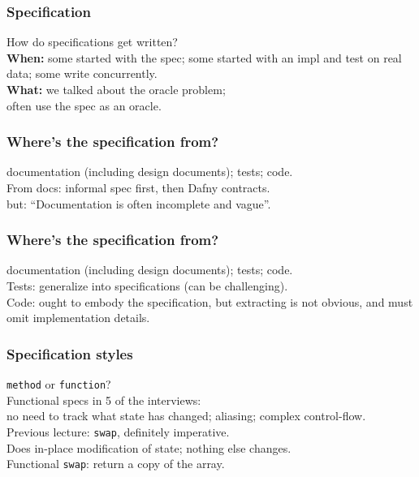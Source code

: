 \documentclass{beamer}
\newenvironment{changemargin}[1]{%
  \begin{list}{}{%
    \setlength{\topsep}{0pt}%
    \setlength{\leftmargin}{#1}%
    \setlength{\rightmargin}{1em}
    \setlength{\listparindent}{\parindent}%
    \setlength{\itemindent}{\parindent}%
    \setlength{\parsep}{\parskip}%
  }%
  \item[]}{\end{list}}
\begin{document}
\begin{frame}
  \frametitle{Specification}
  \Large
  \begin{changemargin}{1cm}
    How do specifications get written?\\[1em]
    {\bf When:} some started with the spec; some started with an impl and test on real data; some write concurrently.\\[1em]
    {\bf What:} we talked about the oracle problem; \\
    often use the spec as an oracle.\\
  \end{changemargin}
\end{frame}

\begin{frame}
  \frametitle{Where's the specification from?}
  \Large
  \begin{changemargin}{1cm}
    documentation (including design documents); tests; code.\\[2em]
    From docs: informal spec first, then Dafny contracts.\\[1em]
    but: ``Documentation is often incomplete and vague''.\\[1em]
  \end{changemargin}
\end{frame}

\begin{frame}
  \frametitle{Where's the specification from?}
  \Large
  \begin{changemargin}{1cm}
    documentation (including design documents); tests; code.\\[2em]
    Tests: generalize into specifications (can be challenging).\\[2em]
    Code: ought to embody the specification, but extracting is not obvious,
    and must omit implementation details.
  \end{changemargin}
\end{frame}

\begin{frame}
  \frametitle{Specification styles}
  \Large
  \begin{changemargin}{1cm}
    \texttt{method} or \texttt{function}?\\[2em]
    Functional specs in 5 of the interviews:\\
    no need to track what state has changed; aliasing; complex control-flow.\\[2em]
    Previous lecture: \texttt{swap}, definitely imperative.\\
    Does in-place modification of state; nothing else changes.\\[1em]
    Functional \texttt{swap}: return a copy of the array.
  \end{changemargin}
\end{frame}
\end{document}

